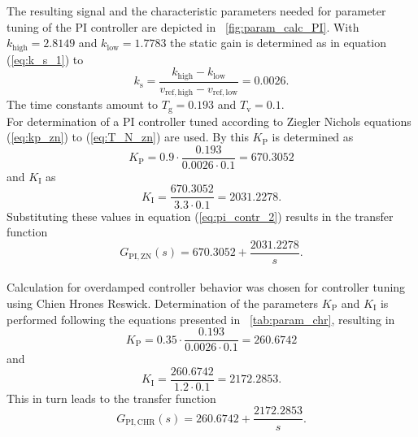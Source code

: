 The resulting signal and the characteristic parameters needed for parameter tuning of the PI controller are depicted in \figurename~\ref{fig:param_calc_PI}. With $k_{\mathrm{high}}=2.8149$ and $k_{\mathrm{low}}=1.7783$ the static gain is determined as in equation (\ref{eq:k_s_1}) to
\begin{equation}
  k_{\mathrm{s}} = \frac{k_{\mathrm{high}}-k_{\mathrm{low}}}{v_{\mathrm{ref,high}}-v_{\mathrm{ref,low}}}= 0.0026.
\label{eq:k_s_2}
\end{equation}
The time constants amount to $T_{\mathrm{g}}=0.193$ and $T_{\mathrm{v}}=0.1$.
\\For determination of a PI controller tuned according to Ziegler Nichols equations (\ref{eq:kp_zn}) to (\ref{eq:T_N_zn}) are used. By this $K_{\mathrm{P}}$ is determined as
\begin{equation}
  K_{\mathrm{P}} = 0.9\cdot\frac{0.193}{0.0026\cdot0.1}=670.3052
\end{equation}
and $K_{\mathrm{I}}$ as
\begin{equation}
  K_{\mathrm{I}}  = \frac{670.3052}{3.3\cdot0.1}=2031.2278.
\end{equation}
Substituting these values in equation (\ref{eq:pi_contr_2}) results in the transfer function
\begin{equation}
  G_{\mathrm{PI,ZN}}(s)=670.3052+\frac{2031.2278}{s}.
\end{equation}
\\Calculation for overdamped controller behavior was chosen for controller tuning using Chien Hrones Reswick. Determination of the parameters $K_{\mathrm{P}}$ and $K_{\mathrm{I}}$ is performed following the equations presented in \tablename~\ref{tab:param_chr}, resulting in
\begin{equation}
  K_{\mathrm{P}} = 0.35\cdot\frac{0.193}{0.0026\cdot0.1}=260.6742
\end{equation}
and
\begin{equation}
  K_{\mathrm{I}} = \frac{260.6742}{1.2\cdot0.1}=2172.2853.
\end{equation}
This in turn leads to the transfer function
\begin{equation}
  G_{\mathrm{PI,CHR}}(s)=260.6742+\frac{2172.2853}{s}.
\end{equation}
